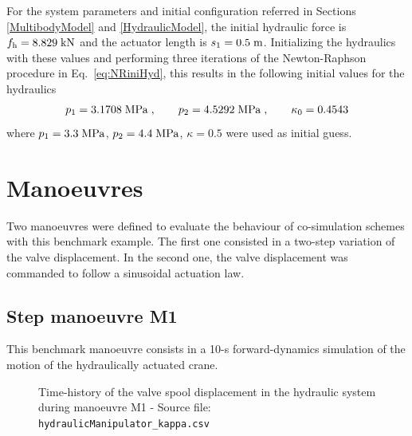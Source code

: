 \documentclass[fleqn,11pt]{article}
\newcommand{\unit}[1]		{ {\; \rm #1} }
\begin{document}
\vspace{0.5cm}
For the system parameters and initial configuration referred in Sections \ref{MultibodyModel} and \ref{HydraulicModel}, the initial hydraulic force is $f_{\text{h}} = 8.829\unit{kN}$ and the actuator length is $s_1 = 0.5\unit{m}$.
Initializing the hydraulics with these values and performing three iterations of the Newton-Raphson procedure in Eq.~\eqref{eq:NRiniHyd}, this results in the following initial values for the hydraulics
\begin{equation}
	p_1 = 3.1708\unit{MPa}\;, \quad\quad p_2 = 4.5292\unit{MPa}\;, \quad\quad \kappa_0 = 0.4543
	\label{eq:iniValHyd}
\end{equation}
where $p_1=3.3\unit{MPa}$, $p_2=4.4\unit{MPa}$, $\kappa = 0.5$ were used as initial guess.


\newpage
\section{Manoeuvres}
\label{Manoeuvres}

Two manoeuvres were defined to evaluate the behaviour of co-simulation schemes with this benchmark example.
The first one consisted in a two-step variation of the valve displacement.
In the second one, the valve displacement was commanded to follow a sinusoidal actuation law.

\subsection{Step manoeuvre M1}
\label{ManoeuvreStep}

This benchmark manoeuvre consists in a 10-s forward-dynamics simulation of the motion of the hydraulically actuated crane.

\begin{figure}[ht]
	\centering
	\caption{Time-history of the valve spool displacement in the hydraulic system during manoeuvre M1 - Source file: \texttt{hydraulicManipulator{\_}kappa.csv}}
	\label{fig:valveTimeHistory}
\end{figure}
\end{document}
